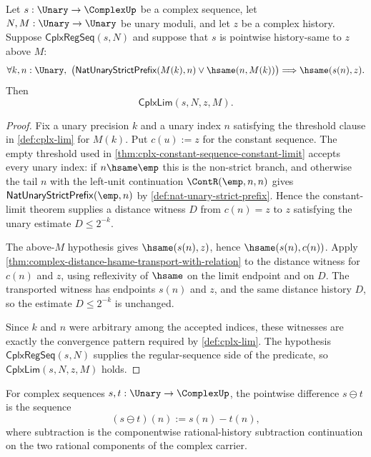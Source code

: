 \begin{theorem}
\label{thm:cplx-eventually-constant-sequence-constant-limit}
Let $s:\Unary\to\ComplexUp$ be a complex sequence, let $N,M:\Unary\to\Unary$ be unary moduli, and let $z$ be a complex history. Suppose $\mathsf{CplxRegSeq}(s,N)$ and suppose that $s$ is pointwise history-same to $z$ above $M$:
$$
\forall k,n:\Unary,\
\bigl(\mathsf{NatUnaryStrictPrefix}(M(k),n)\lor\hsame(n,M(k))\bigr)
\Longrightarrow
\hsame(s(n),z).
$$
Then
$$
\mathsf{CplxLim}(s,N,z,M).
$$
\end{theorem}
\begin{proof}
Fix a unary precision $k$ and a unary index $n$ satisfying the threshold clause in \autoref{def:cplx-lim} for $M(k)$. Put $c(u):=z$ for the constant sequence. The empty threshold used in \autoref{thm:cplx-constant-sequence-constant-limit} accepts every unary index: if $n\hsame\emp$ this is the non-strict branch, and otherwise the tail $n$ with the left-unit continuation $\ContR(\emp,n,n)$ gives $\mathsf{NatUnaryStrictPrefix}(\emp,n)$ by \autoref{def:nat-unary-strict-prefix}. Hence the constant-limit theorem supplies a distance witness $D$ from $c(n)=z$ to $z$ satisfying the unary estimate $D\leq 2^{-k}$.

The above-$M$ hypothesis gives $\hsame(s(n),z)$, hence $\hsame(s(n),c(n))$. Apply \autoref{thm:complex-distance-hsame-transport-with-relation} to the distance witness for $c(n)$ and $z$, using reflexivity of $\hsame$ on the limit endpoint and on $D$. The transported witness has endpoints $s(n)$ and $z$, and the same distance history $D$, so the estimate $D\leq 2^{-k}$ is unchanged.

Since $k$ and $n$ were arbitrary among the accepted indices, these witnesses are exactly the convergence pattern required by \autoref{def:cplx-lim}. The hypothesis $\mathsf{CplxRegSeq}(s,N)$ supplies the regular-sequence side of the predicate, so $\mathsf{CplxLim}(s,N,z,M)$ holds.
\end{proof}

\begin{definition}
\label{def:cplx-pointwise-difference}
For complex sequences $s,t:\Unary\to\ComplexUp$, the pointwise difference $s\ominus t$ is the sequence
$$
(s\ominus t)(n):=s(n)-t(n),
$$
where subtraction is the componentwise rational-history subtraction continuation on the two rational components of the complex carrier.
\end{definition}

